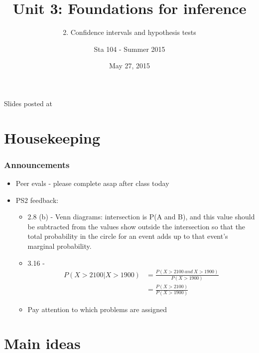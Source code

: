 \documentclass[11pt,containsverbatim,handout,xcolor=xelatex,dvipsnames,table]{beamer}
\title{Unit 3: Foundations for inference}
\subtitle{2. Confidence intervals and hypothesis tests}
\author{Sta 104 - Summer 2015}
\date{May 27, 2015}
\institute{Duke University, Department of Statistical Science}
\begin{document}



\begin{frame}[plain]

\titlepage
\vfill
{\scriptsize {} \hfill Slides posted at  \webLink{\CourseSite}{\CourseSite}}
\addtocounter{framenumber}{-1} 

\end{frame}


\section{Housekeeping}


\begin{frame}
\frametitle{Announcements}

\begin{itemize}

\item Peer evals - please complete asap after class today

\item PS2 feedback:
\begin{itemize}
\item 2.8 (b) - Venn diagrams: intersection is P(A and B), and this value should be subtracted from the values show outside the intersection so that the total probability in the circle for an event adds up to that event's marginal probability.
\item 3.16 -
\begin{align*}
P(X>2100 | X>1900) &= \frac{P(X > 2100 ~and~ X>1900)}{P(X > 1900)} \\
&= \frac{P(X > 2100)}{P(X > 1900)} 
\end{align*}
\item Pay attention to which problems are assigned
\end{itemize}

\end{itemize}

\end{frame}


\section{Main ideas}
\end{document}
